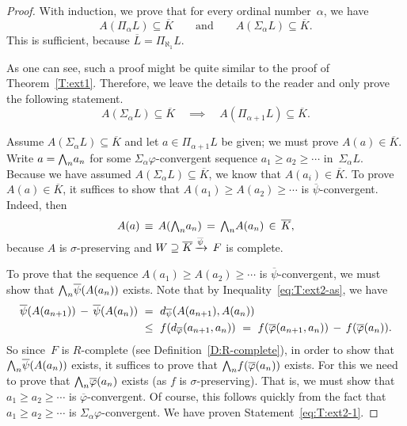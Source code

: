 \documentclass[main.tex]{subfiles}
\begin{document}
\begin{proof}
With induction,
we prove that for every ordinal number~$\alpha$,
we have 
\begin{equation*}
A(\Pi_\alpha L)\subseteq \overline K
\qquad\text{and}\qquad
A(\Sigma_\alpha L)\subseteq \overline K.
\end{equation*}
This is sufficient, because $\overline L = \Pi_{\aleph_1} L$.

As one can  see,
such a proof might be quite similar to the proof of Theorem~\ref{T:ext1}.
Therefore,
we leave the details to the reader
and only prove the following statement.
\begin{equation}
\label{eq:T:ext2-1}
A(\Sigma_\alpha L) \subseteq \overline K
\quad\implies\quad
A(\Pi_{\alpha+1}L)\subseteq\overline K.
\end{equation}

Assume $A(\Sigma_\alpha L)\subseteq \overline{K}$
and let $a\in \Pi_{\alpha+1} L$ be given;
we must prove $A(a)\in \overline K$.
Write $a=\textstyle{\bigwedge}_n a_n$ for some $\Sigma_{\alpha}\varphi$-convergent
sequence
$a_1 \geq a_2 \geq \dotsb$
in~$\Sigma_\alpha L$.
Because we have assumed $A(\Sigma_\alpha L)\subseteq \overline{K}$,
we know that $A(a_i) \in \overline K$.
To prove $A(a)\in\overline K$,
it suffices to show that $A(a_1) \geq A(a_2) \geq \dotsb$
is $\overline{\psi}$-convergent.
Indeed, then
\begin{equation*}
A(a) \,\equiv\, A(\textstyle{\bigwedge}_n a_n) \,=\, \textstyle{\bigwedge}_n A(a_n)\,\in\, \overline{K},
\end{equation*}
because $A$ is $\sigma$-preserving and 
$W \supseteq \overline{K}\,\smash{\xrightarrow{\overline{\psi}}\,F}$
is complete.

To prove that the sequence $A(a_1)\geq A(a_2) \geq \dotsb$
is $\overline{\psi}$-convergent,
we must show that $\textstyle{\bigwedge}_n \overline \psi(A(a_n))$ exists.
Note that by Inequality~\eqref{eq:T:ext2-as},
we have
\begin{alignat*}{3}
\overline{\psi}(A(a_{n+1}))
\,-\, \overline{\psi}(A(a_n))
\ &=\ 
\ld{\overline\psi}(A(a_{n+1}),A(a_n))\\
\ &\leq\ 
f(\ld{\overline\varphi}(a_{n+1},a_n))
\ =\ 
f(\overline\varphi(a_{n+1},a_n)) 
\,-\, f(\overline\varphi(a_n)).
\end{alignat*}
So since~$F$ is $R$-complete (see Definition~\ref{D:R-complete}),
in order to show that $\textstyle{\bigwedge}_n\overline{\psi}(A(a_n))$
exists,
it suffices to prove that $\textstyle{\bigwedge}_n f(\overline{\varphi}(a_n))$
exists. 
For this
we need to prove that $\textstyle{\bigwedge}_n\overline\varphi(a_n)$ exists
(as  $f$ is $\sigma$-preserving).
That is,
we must show that $a_1 \geq a_2 \geq \dotsb$ is 
$\overline{\varphi}$-convergent.
Of course,
this follows quickly from the fact that $a_1 \geq a_2 \geq \dotsb$
is $\Sigma_{\alpha}\varphi$-convergent.
We have proven Statement~\eqref{eq:T:ext2-1}.
\end{proof}
\end{document}

